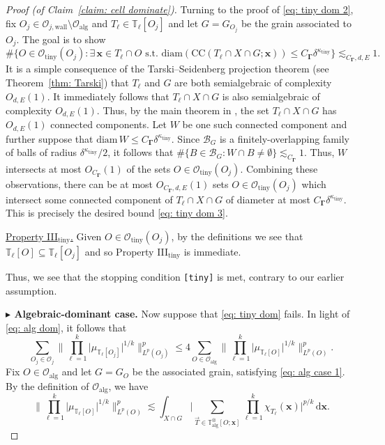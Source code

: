 \documentclass[reqno]{amsart}
\numberwithin{equation}{section}
\newcommand{\T}{\mathbb{T}}
\newcommand{\cB}{\mathcal{B}}
\newcommand{\cO}{\mathcal{O}}
\newcommand{\ud}{\mathrm{d}}
\newcommand{\bx}{\mathbf{x}}
\newcommand{\bdGamma}{\boldsymbol{\Gamma}}
\theoremstyle{plain}
\theoremstyle{definition}
\newcommand{\ttiny}{\mathrm{tiny}}
\newcommand{\alg}{\mathrm{alg}}
\newcommand{\wall}{\mathrm{wall}}
\newcommand{\CC}{\mathrm{CC}}
\newcommand{\diam}{\mathrm{diam}}
\begin{document}
\begin{proof}[Proof (of Claim~\ref{claim: cell dominate})]
Turning to the proof of \eqref{eq: tiny dom 2}, fix $O_j \in \cO_{j,\wall} \setminus \cO_{\alg}$ and $T_{\ell} \in \T_{\ell}[O_j]$ and let $G = G_{O_j}$ be the grain associated to $O_j$. The goal is to show 
\begin{equation}\label{eq: tiny dom 3}
    \#\big\{O \in \cO_{\ttiny}(O_j) : \exists\, \bx \in T_{\ell} \cap O \textrm{ s.t. } \diam(\CC(T_{\ell} \cap X \cap  G; \bx)) \leq C_{\bdGamma}\delta^{\kappa_{\ttiny}}\big\} \lesssim_{C_{\bdGamma}, d,E} 1. 
\end{equation}
It is a simple consequence of the Tarski--Seidenberg projection theorem (see Theorem~\ref{thm: Tarski}) that $T_{\ell}$ and $G$ are both semialgebraic of complexity $O_{d,E}(1)$. It immediately follows that $T_{\ell} \cap X \cap G$ is also semialgebraic of complexity $O_{d,E}(1)$. Thus, by the main theorem in \cite{BPR1996}, the set $T_{\ell} \cap X \cap  G$ has $O_{d,E}(1)$ connected components. Let $W$ be one such connected component and further suppose that $\diam\,W  \leq C_{\bdGamma} \delta^{\kappa_{\ttiny}}$. Since $\cB_G$ is a finitely-overlapping family of balls of radius $\delta^{\kappa_{\ttiny}}/2$, it follows that $\#\{B \in \cB_G : W \cap B \neq \emptyset\} \lesssim_{C_{\bdGamma}} 1$. Thus, $W$ intersects at most $O_{C_{\bdGamma}}(1)$ of the sets $O \in \cO_{\ttiny}(O_j)$. Combining these observations, there can be at most $O_{C_{\bdGamma},d,E}(1)$ sets $O \in \cO_{\ttiny}(O_j)$ which intersect some connected component of $T_{\ell} \cap X \cap G$ of diameter at most $C_{\bdGamma} \delta^{\kappa_{\ttiny}}$. This is precisely the desired bound \eqref{eq: tiny dom 3}. 
\medskip

\noindent \underline{Property III$_{\ttiny}$.} Given $O \in \cO_{\ttiny}(O_j)$, by the definitions we see that $\T_{\ell}[O] \subseteq \T_{\ell}[O_j]$ and so Property III$_{\ttiny}$ is immediate. \medskip

\noindent Thus, we see that the stopping condition \texttt{[tiny]} is met, contrary to our earlier assumption.\medskip


\noindent \textbf{$\blacktriangleright$ Algebraic-dominant case.} Now suppose that \eqref{eq: tiny dom} fails. In light of \eqref{eq: alg dom}, it follows that 
\begin{equation}\label{eq: refined alg dom 1}
   \sum_{O_j \in \cO_j} \Big\|\prod_{\ell = 1}^k \big| \mu_{\T_{\ell}[O_j]}  \big|^{1/k} \Big\|_{L^p(O_j)}^p \leq 4 \sum_{O \in \cO_{\alg}} \Big\|\prod_{\ell = 1}^k \big| \mu_{\T_{\ell}[O]}  \big|^{1/k} \Big\|_{L^p(O)}^p.
\end{equation}
Fix $O \in \cO_{\alg}$ and let $G = G_O$ be the associated grain, satisfying \eqref{eq: alg case 1}. By the definition of $\cO_{\alg}$, we have
\begin{equation}\label{eq: refined alg dom 2}
    \Big\|\prod_{\ell = 1}^k \big| \mu_{\T_{\ell}[O]} \big|^{1/k} \Big\|_{L^p(O)}^p \lesssim \int_{X \cap G} \Big|\sum_{\vec{T} \in \T^{\otimes}_{\alg}[O;\bx]}  \prod_{\ell = 1}^k \chi_{T_\ell}(\bx) \Big|^{p/k} \,\ud \bx.
\end{equation}


\end{proof}
\end{document}
